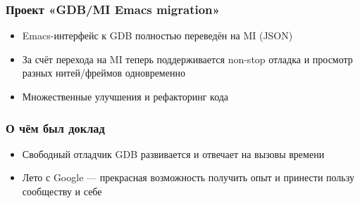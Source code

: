 \documentclass[onlymath]{beamer}
\begin{document}
\begin{frame}
  \frametitle{Проект «GDB/MI Emacs migration»}
  \begin{itemize}
  \item Emacs-интерфейс к GDB полностью переведён на MI (JSON)
  \item За счёт перехода на MI теперь поддерживается non-stop отладка
    и просмотр разных нитей/фреймов одновременно
  \item Множественные улучшения и рефакторинг кода
  \end{itemize}
\end{frame}

\appendix
\begin{frame}
  \frametitle{О чём был доклад}
  \begin{itemize}
  \item Свободный отладчик GDB развивается и отвечает на вызовы
    времени
  \item Лето с Google — прекрасная возможность получить опыт и
    принести пользу сообществу и себе
  \end{itemize}
\end{frame}
\end{document}
